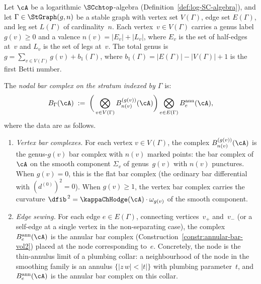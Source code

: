 \begin{construction}%
\label{constr:nodal-bar-model}%
%
%
%
Let $\cA$ be a logarithmic $\SCchtop$-algebra
(Definition~\ref{def:log-SC-algebra}), and let
$\Gamma\in\StGraph(g,n)$ be a stable graph with vertex set
$V(\Gamma)$, edge set $E(\Gamma)$, and leg set
$L(\Gamma)$ of cardinality~$n$. Each vertex~$v\in V(\Gamma)$
carries a genus label $g(v)\ge 0$ and a valence
$n(v) = |E_v| + |L_v|$, where $E_v$ is the set of half-edges at~$v$
and $L_v$ is the set of legs at~$v$. The total genus is
$g = \sum_{v\in V(\Gamma)} g(v) + b_1(\Gamma)$,
where $b_1(\Gamma) = |E(\Gamma)| - |V(\Gamma)| + 1$ is the first
Betti number.

The \emph{nodal bar complex on the stratum indexed by $\Gamma$}
is:
\begin{equation}\label{eq:nodal-bar-complex}
 B_\Gamma(\cA)
 \;:=\;
 \biggl(\,
 \bigotimes_{v\in V(\Gamma)}
 B^{(g(v))}_{n(v)}(\cA)
 \biggr)
 \bigotimes_{e\in E(\Gamma)}
 B^{\mathrm{ann}}_e(\cA),
\end{equation}
where the data are as follows.
\begin{enumerate}[label=\textup{(\roman*)}]
\item \emph{Vertex bar complexes.}
 For each vertex $v\in V(\Gamma)$, the complex
 $B^{(g(v))}_{n(v)}(\cA)$ is the genus-$g(v)$ bar complex
 with $n(v)$ marked points: the bar complex of~$\cA$ on the
 smooth component $\Sigma_v$ of genus~$g(v)$ with $n(v)$
 punctures. When $g(v) = 0$, this is the flat bar complex
 (the ordinary bar differential with $(d^{(0)})^2 = 0$).
 When $g(v)\ge 1$, the vertex bar complex carries the
 curvature $\dfib^{\,2} = \kappaChHodge(\cA)\cdot\omega_{g(v)}$ of
 the smooth component.

\item \emph{Edge sewing.}
 For each edge $e\in E(\Gamma)$, connecting vertices~$v_+$
 and~$v_-$ (or a self-edge at a single vertex in the
 non-separating case), the complex $B^{\mathrm{ann}}_e(\cA)$
 is the annular bar complex
 (Construction~\ref{constr:annular-bar-vol2}) placed at the node
 corresponding to~$e$. Concretely, the node is the thin-annulus
 limit of a plumbing collar: a neighbourhood of the node in the
 smoothing family is an annulus $\{|z\,w| < |t|\}$ with plumbing
 parameter~$t$, and $B^{\mathrm{ann}}_e(\cA)$ is the annular bar
 complex on this collar.


\end{enumerate}
\end{construction}
